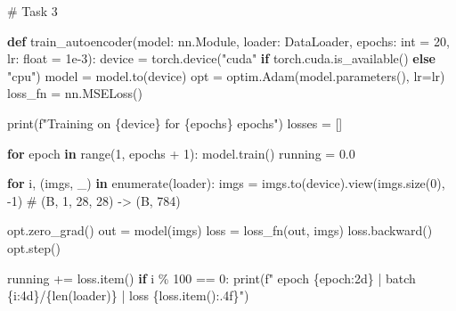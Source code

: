 \documentclass[
  letterpaper,
  DIV=11,
  numbers=noendperiod]{scrartcl}
\newenvironment{Shaded}{\begin{snugshade}}{\end{snugshade}}
\newcommand{\BuiltInTok}[1]{\textcolor[rgb]{0.00,0.23,0.31}{#1}}
\newcommand{\CommentTok}[1]{\textcolor[rgb]{0.37,0.37,0.37}{#1}}
\newcommand{\ControlFlowTok}[1]{\textcolor[rgb]{0.00,0.23,0.31}{\textbf{#1}}}
\newcommand{\DecValTok}[1]{\textcolor[rgb]{0.68,0.00,0.00}{#1}}
\newcommand{\FloatTok}[1]{\textcolor[rgb]{0.68,0.00,0.00}{#1}}
\newcommand{\KeywordTok}[1]{\textcolor[rgb]{0.00,0.23,0.31}{\textbf{#1}}}
\newcommand{\NormalTok}[1]{\textcolor[rgb]{0.00,0.23,0.31}{#1}}
\newcommand{\OperatorTok}[1]{\textcolor[rgb]{0.37,0.37,0.37}{#1}}
\newcommand{\SpecialCharTok}[1]{\textcolor[rgb]{0.37,0.37,0.37}{#1}}
\newcommand{\SpecialStringTok}[1]{\textcolor[rgb]{0.13,0.47,0.30}{#1}}
\newcommand{\StringTok}[1]{\textcolor[rgb]{0.13,0.47,0.30}{#1}}
\begin{document}
\begin{Shaded}
\begin{Highlighting}[]
\CommentTok{\# Task 3}

\KeywordTok{def}\NormalTok{ train\_autoencoder(model: nn.Module, loader: DataLoader, epochs: }\BuiltInTok{int} \OperatorTok{=} \DecValTok{20}\NormalTok{, lr: }\BuiltInTok{float} \OperatorTok{=} \FloatTok{1e{-}3}\NormalTok{):}
\NormalTok{    device }\OperatorTok{=}\NormalTok{ torch.device(}\StringTok{"cuda"} \ControlFlowTok{if}\NormalTok{ torch.cuda.is\_available() }\ControlFlowTok{else} \StringTok{"cpu"}\NormalTok{)}
\NormalTok{    model }\OperatorTok{=}\NormalTok{ model.to(device)}
\NormalTok{    opt }\OperatorTok{=}\NormalTok{ optim.Adam(model.parameters(), lr}\OperatorTok{=}\NormalTok{lr)}
\NormalTok{    loss\_fn }\OperatorTok{=}\NormalTok{ nn.MSELoss()}

    \BuiltInTok{print}\NormalTok{(}\SpecialStringTok{f"Training on }\SpecialCharTok{\{}\NormalTok{device}\SpecialCharTok{\}}\SpecialStringTok{ for }\SpecialCharTok{\{}\NormalTok{epochs}\SpecialCharTok{\}}\SpecialStringTok{ epochs"}\NormalTok{)}
\NormalTok{    losses }\OperatorTok{=}\NormalTok{ []}

    \ControlFlowTok{for}\NormalTok{ epoch }\KeywordTok{in} \BuiltInTok{range}\NormalTok{(}\DecValTok{1}\NormalTok{, epochs }\OperatorTok{+} \DecValTok{1}\NormalTok{):}
\NormalTok{        model.train()}
\NormalTok{        running }\OperatorTok{=} \FloatTok{0.0}

        \ControlFlowTok{for}\NormalTok{ i, (imgs, \_) }\KeywordTok{in} \BuiltInTok{enumerate}\NormalTok{(loader):}
\NormalTok{            imgs }\OperatorTok{=}\NormalTok{ imgs.to(device).view(imgs.size(}\DecValTok{0}\NormalTok{), }\OperatorTok{{-}}\DecValTok{1}\NormalTok{)   }\CommentTok{\# (B, 1, 28, 28) {-}\textgreater{} (B, 784)}

\NormalTok{            opt.zero\_grad()}
\NormalTok{            out }\OperatorTok{=}\NormalTok{ model(imgs)}
\NormalTok{            loss }\OperatorTok{=}\NormalTok{ loss\_fn(out, imgs)}
\NormalTok{            loss.backward()}
\NormalTok{            opt.step()}

\NormalTok{            running }\OperatorTok{+=}\NormalTok{ loss.item()}
            \ControlFlowTok{if}\NormalTok{ i }\OperatorTok{\%} \DecValTok{100} \OperatorTok{==} \DecValTok{0}\NormalTok{:}
                \BuiltInTok{print}\NormalTok{(}\SpecialStringTok{f"  epoch }\SpecialCharTok{\{}\NormalTok{epoch}\SpecialCharTok{:2d\}}\SpecialStringTok{ | batch }\SpecialCharTok{\{}\NormalTok{i}\SpecialCharTok{:4d\}}\SpecialStringTok{/}\SpecialCharTok{\{}\BuiltInTok{len}\NormalTok{(loader)}\SpecialCharTok{\}}\SpecialStringTok{ | loss }\SpecialCharTok{\{}\NormalTok{loss}\SpecialCharTok{.}\NormalTok{item()}\SpecialCharTok{:.4f\}}\SpecialStringTok{"}\NormalTok{)}


\end{Highlighting}
\end{Shaded}
\end{document}
